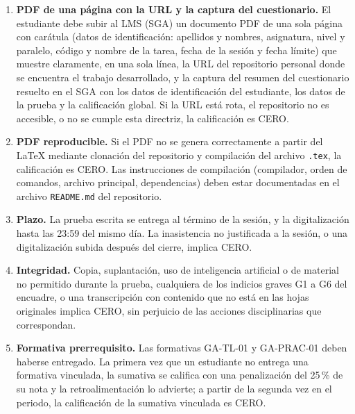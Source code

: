 \documentclass[11pt]{article}
\begin{document}
\begin{cajapiso}[title={Criterios de piso: el incumplimiento de cualquiera implica calificación 0,0/10}]
	\begin{enumerate}[label=\textbf{P\arabic*.},leftmargin=24pt,itemsep=3pt]
		\item \textbf{PDF de una página con la URL y la captura del cuestionario.} El estudiante debe subir al LMS (SGA) un documento PDF de una sola página con carátula (datos de identificación: apellidos y nombres, asignatura, nivel y paralelo, código y nombre de la tarea, fecha de la sesión y fecha límite) que muestre claramente, en una sola línea, la URL del repositorio personal donde se encuentra el trabajo desarrollado, y la captura del resumen del cuestionario resuelto en el SGA con los datos de identificación del estudiante, los datos de la prueba y la calificación global. Si la URL está rota, el repositorio no es accesible, o no se cumple esta directriz, la calificación es CERO.
		\item \textbf{PDF reproducible.} Si el PDF no se genera correctamente a partir del \LaTeX{} mediante clonación del repositorio y compilación del archivo \texttt{.tex}, la calificación es CERO. Las instrucciones de compilación (compilador, orden de comandos, archivo principal, dependencias) deben estar documentadas en el archivo \texttt{README.md} del repositorio.
		\item \textbf{Plazo.} La prueba escrita se entrega al término de la sesión, y la digitalización hasta las 23:59 del mismo día. La inasistencia no justificada a la sesión, o una digitalización subida después del cierre, implica CERO.
		\item \textbf{Integridad.} Copia, suplantación, uso de inteligencia artificial o de material no permitido durante la prueba, cualquiera de los indicios graves G1 a G6 del encuadre, o una transcripción con contenido que no está en las hojas originales implica CERO, sin perjuicio de las acciones disciplinarias que correspondan.
		\item \textbf{Formativa prerrequisito.} Las formativas GA-TL-01 y GA-PRAC-01 deben haberse entregado. La primera vez que un estudiante no entrega una formativa vinculada, la sumativa se califica con una penalización del 25\,\% de su nota y la retroalimentación lo advierte; a partir de la segunda vez en el periodo, la calificación de la sumativa vinculada es CERO.
	\end{enumerate}
\end{cajapiso}
\end{document}

